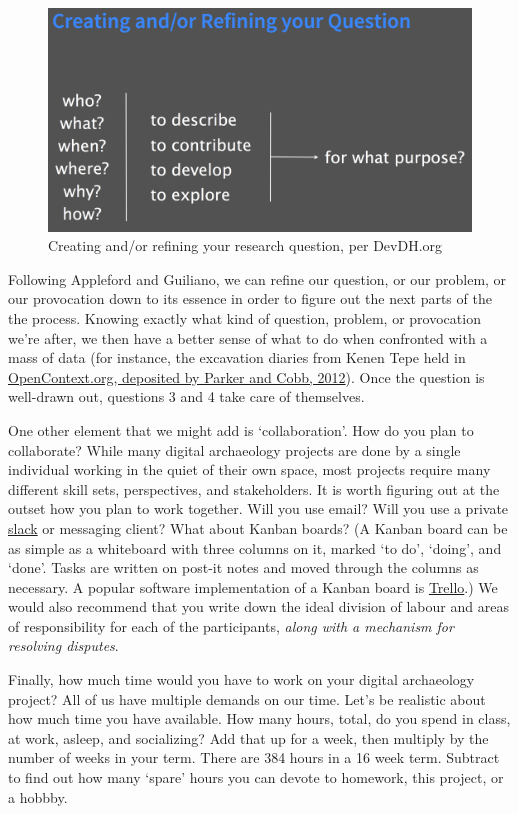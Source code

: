 \documentclass[english,]{book}
\begin{document}
\begin{figure}[htbp]
\centering
\includegraphics{images/creating-refinining-question.png}
\caption{Creating and/or refining your research question, per DevDH.org}
\end{figure}

Following Appleford and Guiliano, we can refine our question, or our
problem, or our provocation down to its essence in order to figure out
the next parts of the the process. Knowing exactly what kind of
question, problem, or provocation we're after, we then have a better
sense of what to do when confronted with a mass of data (for instance,
the excavation diaries from Kenen Tepe held in
\href{https://opencontext.org/projects/3DE4CD9C-259E-4C14-9B03-8B10454BA66E}{OpenContext.org,
deposited by Parker and Cobb, 2012}). Once the question is well-drawn
out, questions 3 and 4 take care of themselves.

One other element that we might add is `collaboration'. How do you plan
to collaborate? While many digital archaeology projects are done by a
single individual working in the quiet of their own space, most projects
require many different skill sets, perspectives, and stakeholders. It is
worth figuring out at the outset how you plan to work together. Will you
use email? Will you use a private \href{http://slack.com}{slack} or
messaging client? What about Kanban boards? (A Kanban board can be as
simple as a whiteboard with three columns on it, marked `to do',
`doing', and `done'. Tasks are written on post-it notes and moved
through the columns as necessary. A popular software implementation of a
Kanban board is \href{http://trello.com}{Trello}.) We would also
recommend that you write down the ideal division of labour and areas of
responsibility for each of the participants, \emph{along with a
mechanism for resolving disputes}.

Finally, how much time would you have to work on your digital
archaeology project? All of us have multiple demands on our time. Let's
be realistic about how much time you have available. How many hours,
total, do you spend in class, at work, asleep, and socializing? Add that
up for a week, then multiply by the number of weeks in your term. There
are 384 hours in a 16 week term. Subtract to find out how many `spare'
hours you can devote to homework, this project, or a hobbby.
\end{document}
